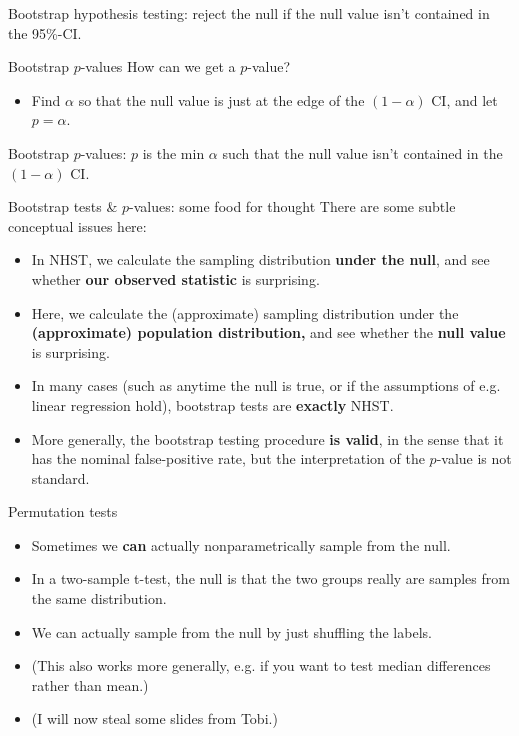 \documentclass{beamer} %
\begin{document}
\begin{frame}[standout]
Bootstrap hypothesis testing: reject the null if the null value isn't contained in the 95\%-CI.
\end{frame}

\begin{frame}{Bootstrap $p$-values}
How can we get a $p$-value? 
\begin{itemize}[<+(1)->]
\item Find $\alpha$ so that the null value is just at the edge of the $(1-\alpha)$ CI,
 and let $p = \alpha$.
\end{itemize}
\end{frame}

\begin{frame}[standout]
Bootstrap $p$-values: $p$ is the min $\alpha$ such that the null value isn't contained in the $(1-\alpha)$ CI.
\end{frame}

\begin{frame}{Bootstrap tests \& $p$-values: some food for thought}
There are some subtle conceptual issues here:
\begin{itemize}[<+(1)->]
\item In NHST, we calculate the sampling distribution \textbf{under the null}, and see whether \textbf{our observed statistic} is surprising.
\item Here, we calculate the (approximate) sampling distribution under the \textbf{(approximate) population distribution,} and see whether the \textbf{null value} is surprising.
\item In many cases (such as anytime the null is true, or if the assumptions of e.g. linear regression hold), bootstrap tests are \textbf{exactly} NHST.
\item More generally, the bootstrap testing procedure \textbf{is valid}, in the sense that it has the nominal false-positive rate, but the interpretation of the $p$-value is not standard.  
\end{itemize}
\end{frame}

\begin{frame}{Permutation tests}
\begin{itemize}[<+->]
\item Sometimes we \textbf{can} actually nonparametrically sample from the null.
\item In a two-sample t-test, the null is that the two groups really are samples from the same distribution. 
\item We can actually sample from the null by just shuffling the labels. 
\item (This also works more generally, e.g. if you want to test median differences rather than mean.) 
\item (I will now steal some slides from Tobi.) 
\end{itemize}
\end{frame}
\end{document}
